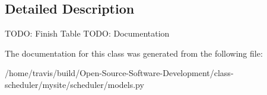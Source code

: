 \subsection{Detailed Description}
\begin{DoxyVerb}    TODO: Finish Table
    TODO: Documentation
\end{DoxyVerb}
 

The documentation for this class was generated from the following file\-:\begin{DoxyCompactItemize}
\item 
/home/travis/build/\-Open-\/\-Source-\/\-Software-\/\-Development/class-\/scheduler/mysite/scheduler/models.\-py\end{DoxyCompactItemize}
